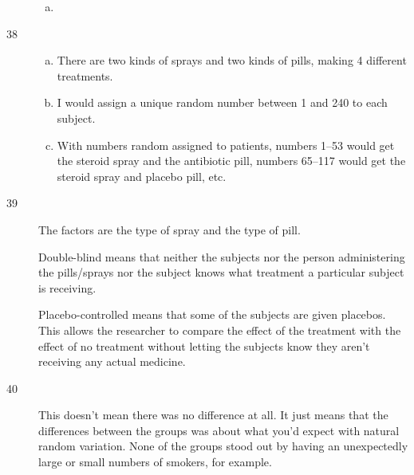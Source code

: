 \documentclass[letterpaper, landscape]{exam}
\begin{document}
\begin{description}
\begin{enumerate}[(a)]
          \item 
        \end{enumerate}

      \item[38]
        \begin{enumerate}[(a)]
          \item There are two kinds of sprays and two kinds of pills, making 4
            different treatments.  

          \item I would assign a unique random number between 1 and 240 to each
            subject.

          \item With numbers random assigned to patients, numbers 1--53 would
            get the steroid spray and the antibiotic pill, numbers 65--117
            would get the steroid spray and placebo pill, etc.
        \end{enumerate}

      \item[39]
        The factors are the type of spray and the type of pill.

        Double-blind means that neither the subjects nor the person
        administering the pills/sprays nor the subject knows what treatment a
        particular subject is receiving.

        Placebo-controlled means that some of the subjects are given placebos.
        This allows the researcher to compare the effect of the treatment with
        the effect of no treatment without letting the subjects know they
        aren't receiving any actual medicine.

      \item[40] This doesn't mean there was no difference at all.  It just means
        that the differences between the groups was about what you'd expect with
        natural random variation.  None of the groups stood out by having an
        unexpectedly large or small numbers of smokers, for example.


\end{description}
\end{document}
